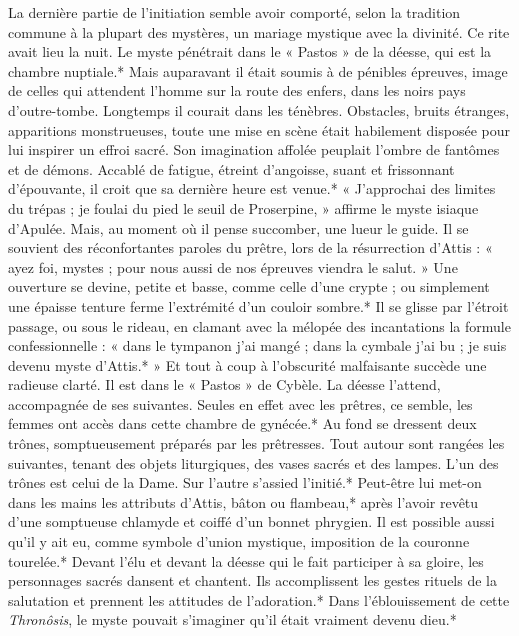 \documentclass[a4paper, 11pt, oneside, polutonikogreek, french]{article}
\begin{document}
La dernière partie de l'initiation semble avoir comporté, selon la tradition commune à la plupart des mystères, un mariage mystique avec la divinité. Ce rite avait lieu la nuit. Le myste pénétrait dans le « Pastos » de la déesse, qui est la chambre nuptiale.* Mais auparavant il était soumis à de pénibles épreuves, image de celles qui attendent l'homme sur la route des enfers, dans les noirs pays d'outre-tombe. Longtemps il courait dans les ténèbres. Obstacles, bruits étranges, apparitions monstrueuses, toute une mise en scène était habilement disposée pour lui inspirer un effroi sacré. Son imagination affolée peuplait l'ombre de fantômes et de démons. Accablé de fatigue, étreint d'angoisse, suant et frissonnant d'épouvante, il croit que sa dernière heure est venue.* « J'approchai des limites du trépas ; je foulai du pied le seuil de Proserpine, » affirme le myste isiaque d'Apulée. Mais, au moment où il pense succomber, une lueur le guide. Il se souvient des réconfortantes paroles du prêtre, lors de la résurrection d'Attis : « ayez foi, mystes ; pour nous aussi de nos épreuves viendra le salut. » Une ouverture se devine, petite et basse, comme celle d'une crypte ; ou simplement une épaisse tenture ferme l'extrémité d'un couloir sombre.* Il se glisse par l'étroit passage, ou sous le rideau, en clamant avec la mélopée des incantations la formule confessionnelle : « dans le tympanon j'ai mangé ; dans la cymbale j'ai bu ; je suis devenu myste d'Attis.* » Et tout à coup à l'obscurité malfaisante succède une radieuse clarté. Il est dans le « Pastos » de Cybèle. La déesse l'attend, accompagnée de ses suivantes. Seules en effet avec les prêtres, ce semble, les femmes ont accès dans cette chambre de gynécée.* Au fond se dressent deux trônes, somptueusement préparés par les prêtresses. Tout autour sont rangées les suivantes, tenant des objets liturgiques, des vases sacrés et des lampes. L'un des trônes est celui de la Dame. Sur l'autre s'assied l'initié.* Peut-être lui met-on dans les mains les attributs d'Attis, bâton ou flambeau,* après l'avoir revêtu d'une somptueuse chlamyde et coiffé d'un bonnet phrygien. Il est possible aussi qu'il y ait eu, comme symbole d'union mystique, imposition de la couronne tourelée.* Devant l'élu et devant la déesse qui le fait participer à sa gloire, les personnages sacrés dansent et chantent. Ils accomplissent les gestes rituels de la salutation et prennent les attitudes de l'adoration.* Dans l'éblouissement de cette \emph{Thronôsis}, le myste pouvait s'imaginer qu'il était vraiment devenu dieu.*
\end{document}

